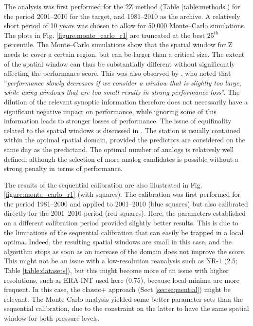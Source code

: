 \documentclass[gmd]{copernicus}
\begin{document}
The analysis was first performed for the 2Z method (Table \ref{table:methods}) for the period 2001--2010 for the target, and 1981--2010 as the archive. A relatively short period of 10 years was chosen to allow for 50,000 Monte--Carlo simulations. The plots in Fig. \ref{figure:monte_carlo_r1} are truncated at the best $25^{th}$ percentile. The Monte--Carlo simulations show that the spatial window for Z needs to cover a certain region, but can be larger than a critical size. The extent of the spatial window can thus be substantially different without significantly affecting the performance score. This was also observed by \citet{Bontron2004}, who noted that ''\textit{performance slowly decreases if we consider a window that is slightly too large, while using windows that are too small results in strong performance loss}''. The dilution of the relevant synoptic information therefore does not necessarily have a significant negative impact on performance, while ignoring some of this information leads to stronger losses of performance. The issue of equifinality related to the spatial windows is discussed in \cite{Radanovics2013}. The station is usually contained within the optimal spatial domain, provided the predictors are considered on the same day as the predictand. The optimal number of analogs is relatively well defined, although the selection of more analog candidates is possible without a strong penalty in terms of performance.

The results of the sequential calibration are also illustrated in Fig. \ref{figure:monte_carlo_r1} (with squares). The calibration was first performed for the period 1981--2000 and applied to 2001--2010 (blue squares) but also calibrated directly for the 2001--2010 period (red squares). Here, the parameters established on a different calibration period provided slightly better results. This is due to the limitations of the sequential calibration that can easily be trapped in a local optima. Indeed, the resulting spatial windows are small in this case, and the algorithm stops as soon as an increase of the domain does not improve the score. This might not be an issue with a low-resolution reanalysis such as NR-1 (2.5\degree; Table \ref{table:datasets}), but this might become more of an issue with higher resolutions, such as ERA-INT used here (0.75\degree), because local minima are more frequent. In this case, the classic+ approach (Sect \ref{sec:sequential}) might be relevant. The Monte-Carlo analysis yielded some better parameter sets than the sequential calibration, due to the constraint on the latter to have the same spatial window for both pressure levels. 
\end{document}
